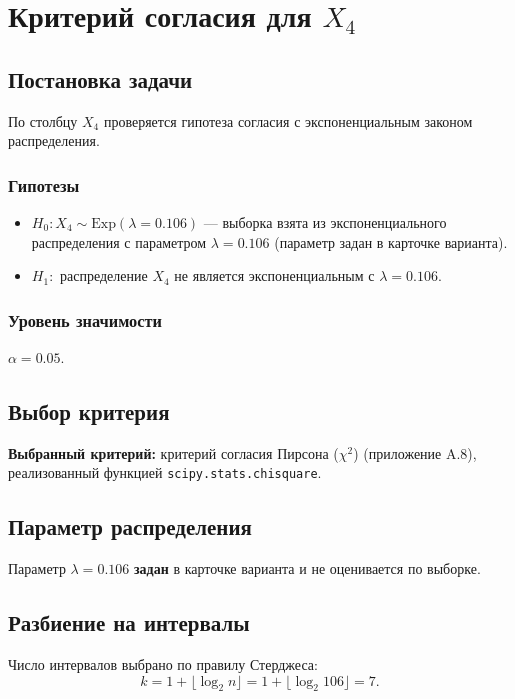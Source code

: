 \section{Критерий согласия для \(X_4\)}

\subsection{Постановка задачи}

По столбцу \(X_4\) проверяется гипотеза согласия с экспоненциальным законом распределения.

\subsubsection{Гипотезы}
\begin{itemize}
    \item \(H_0: X_4 \sim \text{Exp}(\lambda = 0.106)\) — выборка взята из экспоненциального распределения с параметром \(\lambda = 0.106\) (параметр задан в карточке варианта).
    \item \(H_1:\) распределение \(X_4\) не является экспоненциальным с \(\lambda = 0.106\).
\end{itemize}

\subsubsection{Уровень значимости}
\(\alpha = 0.05\).

\subsection{Выбор критерия}

\textbf{Выбранный критерий:} критерий согласия Пирсона (\(\chi^2\)) (приложение A.8), реализованный функцией \texttt{scipy.stats.chisquare}.

\subsection{Параметр распределения}

Параметр \(\lambda = 0.106\) \textbf{задан} в карточке варианта и не оценивается по выборке.

\subsection{Разбиение на интервалы}

Число интервалов выбрано по правилу Стерджеса:
\[
k = 1 + \lfloor \log_2 n \rfloor = 1 + \lfloor \log_2 106 \rfloor = 7.
\]

